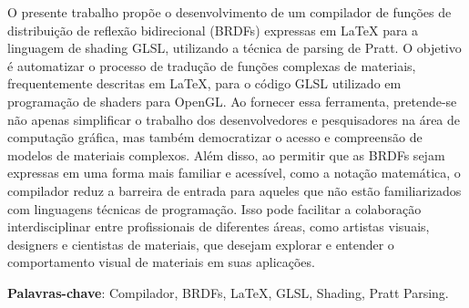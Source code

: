 \setlength{\absparsep}{18pt} %
\begin{resumo}
 


O presente trabalho propõe o desenvolvimento de um compilador de funções de distribuição de reflexão bidirecional (BRDFs) expressas em LaTeX para a linguagem de shading GLSL, utilizando a técnica de parsing de Pratt. O objetivo é automatizar o processo de tradução de funções complexas de materiais, frequentemente descritas em LaTeX, para o código GLSL utilizado em programação de shaders para OpenGL. Ao fornecer essa ferramenta, pretende-se não apenas simplificar o trabalho dos desenvolvedores e pesquisadores na área de computação gráfica, mas também democratizar o acesso e compreensão de modelos de materiais complexos. Além disso, ao permitir que as BRDFs sejam expressas em uma forma mais familiar e acessível, como a notação matemática, o compilador reduz a barreira de entrada para aqueles que não estão familiarizados com linguagens técnicas de programação. Isso pode facilitar a colaboração interdisciplinar entre profissionais de diferentes áreas, como artistas visuais, designers e cientistas de materiais, que desejam explorar e entender o comportamento visual de materiais em suas aplicações.

 \textbf{Palavras-chave}: Compilador, BRDFs, LaTeX, GLSL, Shading, Pratt Parsing.
\end{resumo}
